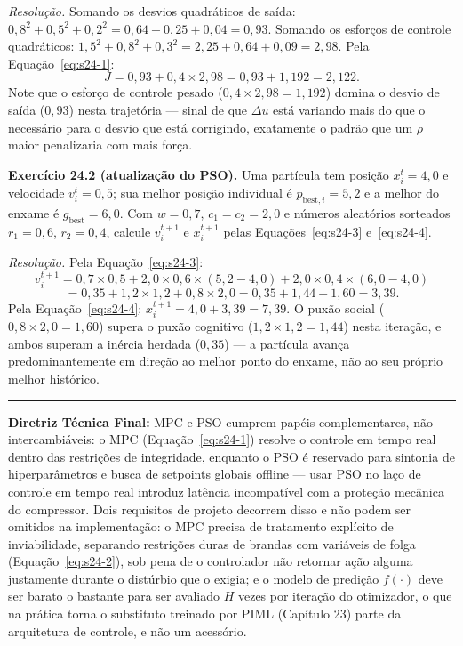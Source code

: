 \documentclass[12pt,a4paper]{article}
\numberwithin{equation}{section}
\numberwithin{table}{section}
\numberwithin{figure}{section}
\begin{document}
	\emph{Resolução.} Somando os desvios quadráticos de saída:
	$0{,}8^2+0{,}5^2+0{,}2^2 = 0{,}64+0{,}25+0{,}04 = 0{,}93$. Somando os
	esforços de controle quadráticos:
	$1{,}5^2+0{,}8^2+0{,}3^2 = 2{,}25+0{,}64+0{,}09 = 2{,}98$. Pela
	Equação~\eqref{eq:s24-1}:
	$$J = 0{,}93 + 0{,}4 \times 2{,}98 = 0{,}93 + 1{,}192 = 2{,}122.$$
	Note que o esforço de controle pesado ($0{,}4 \times 2{,}98=1{,}192$)
	domina o desvio de saída ($0{,}93$) nesta trajetória --- sinal de que
	$\Delta u$ está variando mais do que o necessário para o desvio que
	está corrigindo, exatamente o padrão que um $\rho$ maior penalizaria
	com mais força.

	\textbf{Exercício 24.2 (atualização do PSO).} Uma partícula tem
	posição $x_i^t=4{,}0$ e velocidade $v_i^t=0{,}5$; sua melhor posição
	individual é $p_{\text{best},i}=5{,}2$ e a melhor do enxame é
	$g_{\text{best}}=6{,}0$. Com $w=0{,}7$, $c_1=c_2=2{,}0$ e números
	aleatórios sorteados $r_1=0{,}6$, $r_2=0{,}4$, calcule $v_i^{t+1}$ e
	$x_i^{t+1}$ pelas Equações~\eqref{eq:s24-3} e~\eqref{eq:s24-4}.

	\emph{Resolução.} Pela Equação~\eqref{eq:s24-3}:
	$$v_i^{t+1} = 0{,}7 \times 0{,}5 + 2{,}0 \times 0{,}6 \times
	(5{,}2-4{,}0) + 2{,}0 \times 0{,}4 \times (6{,}0-4{,}0)$$
	$$= 0{,}35 + 1{,}2 \times 1{,}2 + 0{,}8 \times 2{,}0 = 0{,}35+1{,}44+1{,}60
	= 3{,}39.$$
	Pela Equação~\eqref{eq:s24-4}: $x_i^{t+1} = 4{,}0 + 3{,}39 = 7{,}39$.
	O puxão social ($0{,}8\times 2{,}0=1{,}60$) supera o puxão cognitivo
	($1{,}2\times 1{,}2=1{,}44$) nesta iteração, e ambos superam a
	inércia herdada ($0{,}35$) --- a partícula avança predominantemente
	em direção ao melhor ponto do enxame, não ao seu próprio melhor
	histórico.

	\vspace{1em}
	\hrule
	\vspace{1em}

	\textbf{Diretriz Técnica Final:} MPC e PSO cumprem papéis complementares, não intercambiáveis: o MPC (Equação~\eqref{eq:s24-1}) resolve o controle em tempo real dentro das restrições de integridade, enquanto o PSO é reservado para sintonia de hiperparâmetros e busca de setpoints globais offline — usar PSO no laço de controle em tempo real introduz latência incompatível com a proteção mecânica do compressor. Dois requisitos de projeto decorrem disso e não podem ser omitidos na implementação: o MPC precisa de tratamento explícito de inviabilidade, separando restrições duras de brandas com variáveis de folga (Equação~\eqref{eq:s24-2}), sob pena de o controlador não retornar ação alguma justamente durante o distúrbio que o exigia; e o modelo de predição $f(\cdot)$ deve ser barato o bastante para ser avaliado $H$ vezes por iteração do otimizador, o que na prática torna o substituto treinado por PIML (Capítulo 23) parte da arquitetura de controle, e não um acessório.
\end{document}
